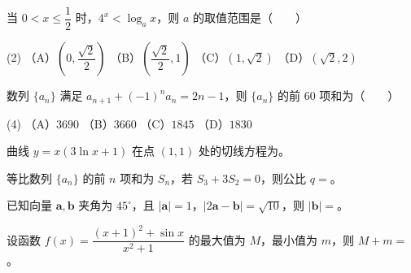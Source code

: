 \begin{question}
当 $0<x\leqslant\dfrac12$ 时，$4^x<\log_a x$，则 $a$ 的取值范围是\mbox{（　　）}

\begin{gkopts}(2)
\task （A）$\left(0,\dfrac{\sqrt2}{2}\right)$
\task （B）$\left(\dfrac{\sqrt2}{2},1\right)$
\task （C）$(1,\sqrt2)$
\task （D）$(\sqrt2,2)$
\end{gkopts}

\end{question}
\begin{question}
数列 $\{a_n\}$ 满足 $a_{n+1}+(-1)^n a_n=2n-1$，则 $\{a_n\}$ 的前 $60$ 项和为\mbox{（　　）}

\begin{gkopts}(4)
\task （A）$3690$
\task （B）$3660$
\task （C）$1845$
\task （D）$1830$
\end{gkopts}

\end{question}

\begin{question}
曲线 $y=x(3\ln x+1)$ 在点 $(1,1)$ 处的切线方程为\gkblank{}。

\end{question}
\begin{question}
等比数列 $\{a_n\}$ 的前 $n$ 项和为 $S_n$，若 $S_3+3S_2=0$，则公比 $q=$\gkblank{}。

\end{question}
\begin{question}
已知向量 $\boldsymbol a,\boldsymbol b$ 夹角为 $45^\circ$，且 $|\boldsymbol a|=1$，$|2\boldsymbol a-\boldsymbol b|=\sqrt{10}$，则 $|\boldsymbol b|=$\gkblank{}。

\end{question}
\begin{question}
设函数 $f(x)=\dfrac{(x+1)^2+\sin x}{x^2+1}$ 的最大值为 $M$，最小值为 $m$，则 $M+m=$\gkblank{}。

\end{question}

